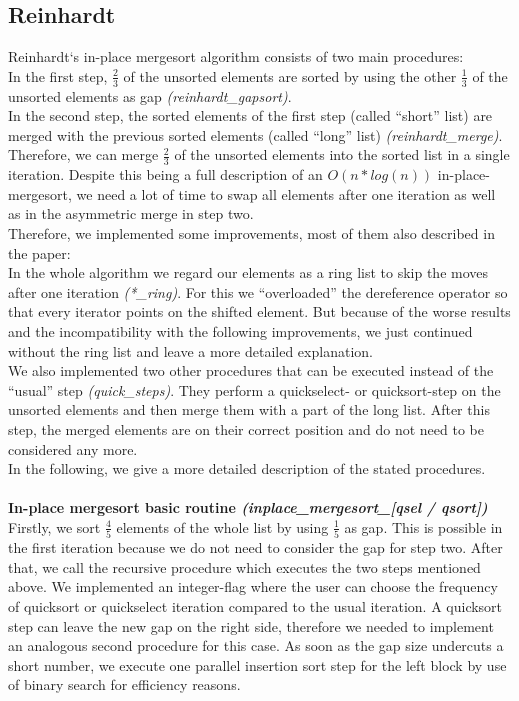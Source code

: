 \documentclass[11pt,pdftex,a4paper, twocolumn]{article}
\begin{document}
\subsection*{Reinhardt}
Reinhardt‘s in-place mergesort algorithm consists of two main procedures: \\
In the first step, $\frac{2}{3}$ of the unsorted elements are sorted by using the other $\frac{1}{3}$ of the unsorted elements as gap \textit{(reinhardt\_gapsort)}. \\
In the second step, the sorted elements of the first step (called “short” list) are merged with the previous sorted elements (called “long” list) \textit{(reinhardt\_merge)}. \\
Therefore, we can merge $\frac{2}{3}$ of the unsorted elements into the sorted list in a single iteration. Despite this being a full description of an $O(n*log(n))$ in-place-mergesort, we need a lot of time to swap all elements after one iteration as well as in the asymmetric merge in step two. \\
Therefore, we implemented some improvements, most of them also described in the paper: \\
In the whole algorithm we regard our elements as a ring list to skip the moves after one iteration \textit{(*\_ring)}. For this we “overloaded” the dereference operator so that every iterator points on the shifted element. But because of the worse results and the incompatibility with the following improvements, we just continued without the ring list and leave a more detailed explanation. \\
We also implemented two other procedures that can be executed instead of the “usual” step \textit{(quick\_steps)}. They perform a quickselect- or quicksort-step on the unsorted elements and then merge them with a part of the long list. After this step, the merged elements are on their correct position and do not need to be considered any more. \\
In the following, we give a more detailed description of the stated procedures. \\
$ $ \\
\textbf{In-place mergesort basic routine \textit{(inplace\_mergesort\_[qsel / qsort])}} \\
Firstly, we sort $\frac{4}{5}$ elements of the whole list by using $\frac{1}{5}$ as gap. This is possible in the first iteration because we do not need to consider the gap for step two. After that, we call the recursive procedure which executes the two steps mentioned above. We implemented an integer-flag where the user can choose the frequency of quicksort or quickselect iteration compared to the usual iteration. A quicksort step can leave the new gap on the right side, therefore we needed to implement an analogous second procedure for this case. As soon as the gap size undercuts a short number, we execute one parallel insertion sort step for the left block by use of binary search for efficiency reasons. \\
\end{document}
